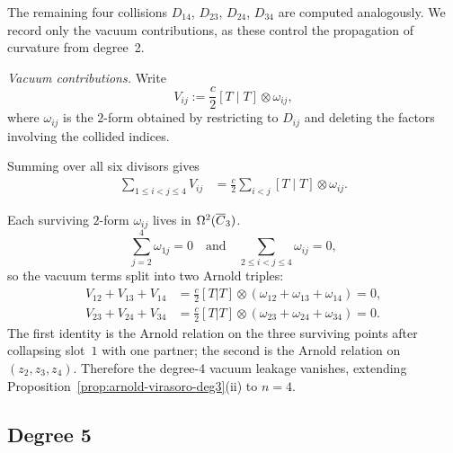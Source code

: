 \begin{computation}
The remaining four collisions $D_{14}$, $D_{23}$, $D_{24}$, $D_{34}$
are computed analogously.  We record only the vacuum contributions,
as these control the propagation of curvature from degree~2.

\emph{Vacuum contributions.}
Write
\[
V_{ij} := \frac{c}{2} [T \mid T] \otimes \omega_{ij},
\]
where $\omega_{ij}$ is the $2$-form obtained by restricting to
$D_{ij}$ and deleting the factors involving the collided indices.

Summing over all six divisors gives
\begin{align}
\sum_{1 \leq i < j \leq 4} V_{ij}
&= \frac{c}{2} \sum_{i < j} [T \mid T] \otimes \omega_{ij}.
\label{eq:vir-deg4-vacuum}
\end{align}

Each surviving $2$-form $\omega_{ij}$ lives in $\Omega^2(\overline{C}_3)$.
\begin{equation}\label{eq:vir-deg4-arnold}
\sum_{j=2}^{4} \omega_{1j} = 0
\quad \text{and} \quad
\sum_{2 \leq i < j \leq 4} \omega_{ij} = 0,
\end{equation}
so the vacuum terms split into two Arnold triples:
\begin{align*}
V_{12} + V_{13} + V_{14}
&= \frac{c}{2}[T|T] \otimes
  (\omega_{12} + \omega_{13} + \omega_{14}) = 0, \\
V_{23} + V_{24} + V_{34}
&= \frac{c}{2}[T|T] \otimes
  (\omega_{23} + \omega_{24} + \omega_{34}) = 0.
\end{align*}
The first identity is the Arnold relation on the three surviving
points after collapsing slot~$1$ with one partner; the second is the
Arnold relation on $(z_2, z_3, z_4)$.  Therefore the degree-4 vacuum
leakage vanishes, extending
Proposition~\ref{prop:arnold-virasoro-deg3}(ii) to $n = 4$.
\end{computation}

\subsection{Degree 5}


